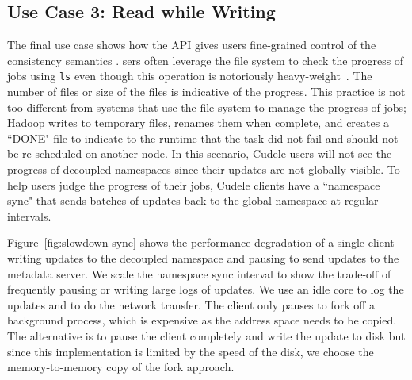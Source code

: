 

\subsection{Use Case 3: Read while Writing}

The final use case shows how the API gives users fine-grained control of the
consistency semantics . sers often
leverage the file system to check the progress of jobs using \texttt{ls} even
though this operation is notoriously heavy-weight~\cite{carns:ipdps09-pvfs,
eshel:fast10-panache}. The number of files or size of the files is indicative
of the progress. This practice is not too different from systems that use the
file system to manage the progress of jobs; Hadoop writes to temporary files,
renames them when complete, and creates a ``DONE" file to indicate to the
runtime that the task did not fail and should not be re-scheduled on another
node. In this scenario, Cudele users will not see the progress of decoupled
namespaces since their updates are not globally visible.  To help users judge
the progress of their jobs, Cudele clients have a ``namespace sync" that sends
batches of updates back to the global namespace at regular intervals.

Figure~\ref{fig:slowdown-sync} shows the performance degradation of a single
client writing  updates to the decoupled namespace and
pausing to send updates to the metadata server.  We scale the namespace sync interval to
show the trade-off of frequently pausing or writing large logs of updates.  We
use an idle core to log the updates and to do the network transfer. The client
only pauses to fork off a background process, which is expensive as the address
space needs to be copied. The alternative is to pause the client completely and
write the update to disk but since this implementation is limited by the speed
of the disk, we choose the memory-to-memory copy of the fork approach.

